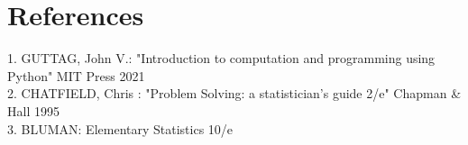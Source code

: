 \hypertarget{references}{%
\section{References}\label{references}}

1. GUTTAG, John V.: "Introduction to computation and programming using
Python" MIT Press 2021\\
2. CHATFIELD, Chris : "Problem Solving: a statistician's guide 2/e"
Chapman \& Hall 1995\\
3. BLUMAN: Elementary Statistics 10/e\\





